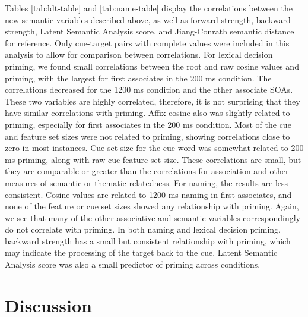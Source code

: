 \documentclass[english,,man]{apa6}
\theoremstyle{definition}
\theoremstyle{definition}
\theoremstyle{definition}
\theoremstyle{remark}
\begin{document}
Tables \ref{tab:ldt-table} and \ref{tab:name-table} display the
correlations between the new semantic variables described above, as well
as forward strength, backward strength, Latent Semantic Analysis score,
and Jiang-Conrath semantic distance for reference. Only cue-target pairs
with complete values were included in this analysis to allow for
comparison between correlations. For lexical decision priming, we found
small correlations between the root and raw cosine values and priming,
with the largest for first associates in the 200 ms condition. The
correlations decreased for the 1200 ms condition and the other associate
SOAs. These two variables are highly correlated, therefore, it is not
surprising that they have similar correlations with priming. Affix
cosine also was slightly related to priming, especially for first
associates in the 200 ms condition. Most of the cue and feature set
sizes were not related to priming, showing correlations close to zero in
most instances. Cue set size for the cue word was somewhat related to
200 ms priming, along with raw cue feature set size. These correlations
are small, but they are comparable or greater than the correlations for
association and other measures of semantic or thematic relatedness. For
naming, the results are less consistent. Cosine values are related to
1200 ms naming in first associates, and none of the feature or cue set
sizes showed any relationship with priming. Again, we see that many of
the other associative and semantic variables correspondingly do not
correlate with priming. In both naming and lexical decision priming,
backward strength has a small but consistent relationship with priming,
which may indicate the processing of the target back to the cue. Latent
Semantic Analysis score was also a small predictor of priming across
conditions.

\section{Discussion}\label{discussion}
\end{document}

